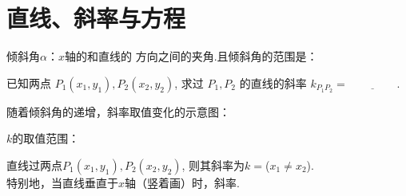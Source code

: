 \documentclass{book}
\begin{document}
    \chapter{直线、斜率与方程}

      \begin{Exercise}\label{ex1.1}
        \vspace{-\baselineskip}

        \Question 倾斜角$\alpha$：$x$轴的\underline{\hspace{1cm}}和直线的\underline{\hspace{1cm}} 方向之间的夹角.且倾斜角的范围是：\underline{\hspace{52pt}}

        \Question 已知两点 $ P_1(x_1,y_1), P_2(x_2,y_2) $, 求过 $P_1, P_2$ 的直线的斜率
         $k_{P_1P_2}=\underline{\hspace{52pt}} $.

        \Question 随着倾斜角的递增，斜率取值变化的示意图：

        \begin{minipage}{0.7\textwidth}
          $k$的取值范围：\underline{\hspace{52pt}}
        \end{minipage}
        \begin{minipage}{0.3\textwidth}
        \end{minipage}

        \Question 直线过两点$P_1(x_1,y_1), P_2(x_2,y_2)$, 则其斜率为$k=$\underline{\hspace{52pt}}($x_1 \neq x_2$).\\
                  特别地，当直线垂直于$x$轴（竖着画）时，斜率\underline{\hspace{52pt}}.

      \end{Exercise}
\end{document}

